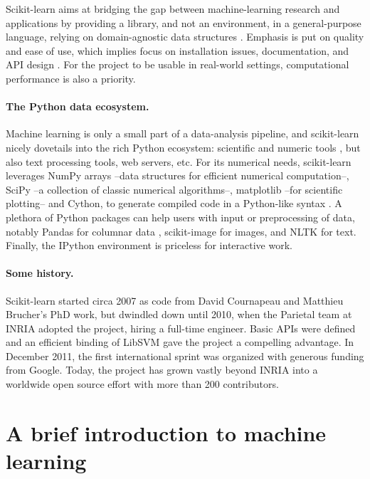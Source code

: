 \documentclass[a4paper]{article}
\begin{document}
Scikit-learn aims at bridging the gap between machine-learning research and
applications by providing a library, and not an environment, in a
general-purpose language, relying on domain-agnostic data structures
\cite{pedregosa2011}. Emphasis is put on quality and ease of use, which
implies focus on installation issues, documentation, and API design
\cite{buitinck2013ecml}. For the project to be usable in real-world
settings, computational performance is also a priority.

\paragraph{The Python data ecosystem.}
%
Machine learning is only a small part of a data-analysis pipeline, and
scikit-learn nicely dovetails into the rich Python ecosystem: scientific
and numeric tools \cite{oliphant2007python,varoquaux2013scipy}, but also
text processing tools, web servers, etc.
%
For its numerical needs, scikit-learn leverages NumPy arrays
\cite{vanderwalt2011} --data structures for efficient numerical
computation--, SciPy --a collection of classic numerical algorithms--,
matplotlib \cite{hunter2007matplotlib} --for scientific plotting-- and
Cython, to generate compiled code in a Python-like syntax
\cite{behnel2011cython}.
%
A plethora of Python packages can help users with input or preprocessing
of data, notably Pandas for columnar data \cite{mckinney2012}, scikit-image
for images, and NLTK for text. Finally, the IPython environment
\cite{perez2007ipython} is priceless for interactive work.

\paragraph{Some history.}
%
Scikit-learn started circa 2007 as code from David Cournapeau and
Matthieu Brucher's PhD work, but dwindled down until 2010, when the
Parietal team at INRIA adopted the project, hiring a full-time
engineer. Basic APIs were defined and an efficient binding of LibSVM
\cite{chang2011libsvm} gave the project a compelling advantage. In
December 2011, the first international sprint was organized with generous
funding from Google. Today, the project has grown vastly beyond
INRIA into a worldwide open source effort with more than 200 contributors.

\section{A brief introduction to machine learning}
\end{document}

